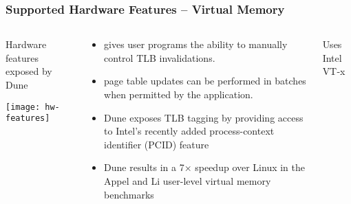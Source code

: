 \begin{frame}[plain]
	\frametitle{Supported Hardware Features -- Virtual Memory}
	
	
	
	\begin{columns}
		
		\begin{column}{.4\textwidth}
			\centering
			Hardware features exposed by Dune
			
			\texttt{[image: hw-features]}
			
		\end{column}
		
		\begin{column}{.6\textwidth}
			
			
			\begin{itemize}
				\item  gives user programs the ability to manually
				control TLB invalidations.
				\item page table updates
				can be performed in batches when permitted by the application. 
				\item Dune exposes TLB tagging by providing access to Intel’s recently added process-context identifier (PCID) feature
				\item Dune results in a 7× speedup		over Linux in the Appel and Li user-level virtual memory		benchmarks 
				
			\end{itemize}					
			
		\end{column}
		Uses	 Intel VT‐x		
		
	\end{columns}
	
	
\end{frame}




